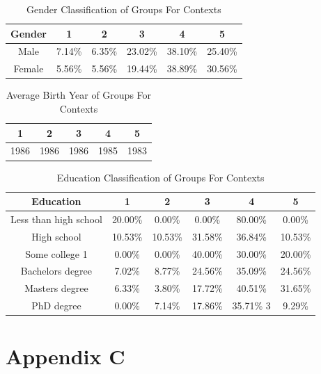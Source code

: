 \begin{table}[h!]
  \centering
  \caption{Gender Classification of Groups For Contexts}
  \label{tab:gender_c}
  \begin{tabular}{cccccc}
    \toprule
     Gender&1&2&3&4&5 \\
    \midrule
Male&	7.14\%	&6.35\%	&23.02\%	&38.10\%	&25.40\% \\
Female	&5.56\%	&5.56\%	&19.44\%	&38.89\%	&30.56\% \\
    \bottomrule
  \end{tabular}
\end{table}



\begin{table}[h!]
  \centering
  \caption{Average Birth Year of Groups For Contexts}
  \label{tab:year_c}
  \begin{tabular}{ccccc}
    \toprule
     1&2&3&4&5\\
    \midrule
	1986& 1986& 1986& 1985& 1983\\
    \bottomrule
  \end{tabular}
\end{table}


\begin{table}[h!]
  \centering
  \caption{Education Classification of Groups For Contexts}
  \label{tab:edu_c}
  \begin{tabular}{cccccc}
    \toprule
     Education&1&2&3&4&5\\
    \midrule
    
Less than high school	&20.00\%	&0.00\%	&0.00\%	&80.00\%	&0.00\%\\
High school	&10.53\%	&10.53\%	&31.58\%	&36.84\%	&10.53\%\\
Some college	1&0.00\%	&0.00\%	&40.00\%	&30.00\%	&20.00\%\\
Bachelors degree	&7.02\%	&8.77\%	&24.56\%	&35.09\%	&24.56\%\\
Masters degree	&6.33\%	&3.80\%	&17.72\%	&40.51\%	&31.65\%\\
PhD degree	&0.00\%	&7.14\%	&17.86\%	&35.71\%	3&9.29\%\\
    \bottomrule
  \end{tabular}
\end{table} 

\chapter{Appendix C}



